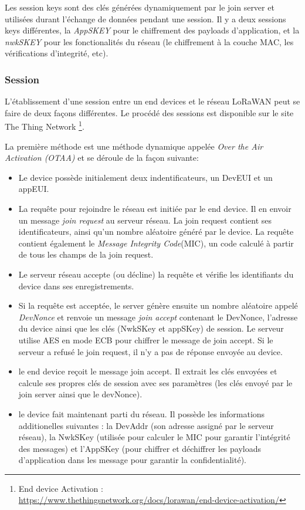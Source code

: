 Les session keys sont des clés générées dynamiquement par le join server et utilisées durant l'échange de données pendant une session. Il y a deux sessions keys différentes, la \textit{AppSKEY} pour le chiffrement des payloads d'application, et la \textit{nwkSKEY} pour les fonctionalités du réseau (le chiffrement à la couche MAC, les vérifications d'integrité, etc).

\subsubsection{Session}

L'établissement d'une session entre un end devices et le réseau LoRaWAN peut se faire de deux façons différentes. Le procédé des sessions est disponible sur le site The Thing Network \footnote{End device Activation : \href{https://www.thethingsnetwork.org/docs/lorawan/end-device-activation/}{https://www.thethingsnetwork.org/docs/lorawan/end-device-activation/}}.

La première méthode est une méthode dynamique appelée \textit{Over the Air Activation (OTAA)} et se déroule de la façon suivante: 
\begin{itemize}
\item Le device possède initialement deux indentificateurs, un DevEUI et un appEUI.
\item La requête pour rejoindre le réseau est initiée par le end device. Il en envoir un message \textit{join request} au serveur réseau. La join request contient ses identificateurs, ainsi qu'un nombre aléatoire généré par le device. La requête contient également le \textit{Message Integrity Code}(MIC), un code calculé à partir de tous les champs de la join request.
\item Le serveur réseau accepte (ou décline) la requête et vérifie les identifiants du device dans ses enregistrements.
\item Si la requête est acceptée, le server génère ensuite un nombre aléatoire appelé \textit{DevNonce} et renvoie un message \textit{join accept} contenant le DevNonce, l'adresse du device ainsi que les clés (NwkSKey et appSKey) de session. Le serveur utilise AES en mode ECB pour chiffrer le message de join accept. Si le serveur a refusé le join request, il n'y a pas de réponse envoyée au device.
\item le end device reçoit le message join accept. Il extrait les clés envoyées et calcule ses propres clés de session avec ses paramètres (les clés envoyé par le join server ainsi que le devNonce).
\item le device fait maintenant parti du réseau. Il possède les informations additionelles suivantes : la DevAddr (son adresse assigné par le serveur réseau), la NwkSKey (utilisée pour calculer le MIC pour garantir l'intégrité des messages) et l'AppSKey (pour chiffrer et déchiffrer les payloads d'application dans les message pour garantir la confidentialité).
\end{itemize}
        
